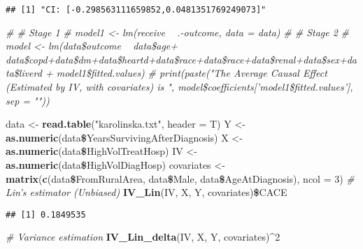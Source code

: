 \documentclass[]{article}
\newenvironment{Shaded}{\begin{snugshade}}{\end{snugshade}}
\newcommand{\KeywordTok}[1]{\textcolor[rgb]{0.13,0.29,0.53}{\textbf{#1}}}
\newcommand{\DataTypeTok}[1]{\textcolor[rgb]{0.13,0.29,0.53}{#1}}
\newcommand{\DecValTok}[1]{\textcolor[rgb]{0.00,0.00,0.81}{#1}}
\newcommand{\StringTok}[1]{\textcolor[rgb]{0.31,0.60,0.02}{#1}}
\newcommand{\CommentTok}[1]{\textcolor[rgb]{0.56,0.35,0.01}{\textit{#1}}}
\newcommand{\OperatorTok}[1]{\textcolor[rgb]{0.81,0.36,0.00}{\textbf{#1}}}
\newcommand{\NormalTok}[1]{#1}
\begin{document}
\begin{verbatim}
## [1] "CI: [-0.298563111659852,0.0481351769249073]"
\end{verbatim}

\begin{Shaded}
\begin{Highlighting}[]
\CommentTok{# # Stage 1}
\CommentTok{# model1 <- lm(receive ~ .-outcome, data = data)}
\CommentTok{# # Stage 2}
\CommentTok{# model <- lm(data\$outcome ~ data\$age+ data\$copd+data\$dm+data\$heartd+data\$race+data\$race+data\$renal+data\$sex+data\$liverd + model1\$fitted.values)}
\CommentTok{# print(paste("The Average Causal Effect (Estimated by IV, with covariates) is ", model\$coefficients['model1\$fitted.values'], sep = ""))}
\end{Highlighting}
\end{Shaded}

\begin{Shaded}
\begin{Highlighting}[]
\NormalTok{data <-}\StringTok{  }\KeywordTok{read.table}\NormalTok{(}\StringTok{"karolinska.txt"}\NormalTok{, }\DataTypeTok{header =}\NormalTok{ T)}
\NormalTok{Y <-}\StringTok{ }\KeywordTok{as.numeric}\NormalTok{(data}\OperatorTok{\$}\NormalTok{YearsSurvivingAfterDiagnosis)}
\NormalTok{X <-}\StringTok{ }\KeywordTok{as.numeric}\NormalTok{(data}\OperatorTok{\$}\NormalTok{HighVolTreatHosp)}
\NormalTok{IV <-}\StringTok{ }\KeywordTok{as.numeric}\NormalTok{(data}\OperatorTok{\$}\NormalTok{HighVolDiagHosp)}
\NormalTok{covariates <-}\StringTok{ }\KeywordTok{matrix}\NormalTok{(}\KeywordTok{c}\NormalTok{(data}\OperatorTok{\$}\NormalTok{FromRuralArea, data}\OperatorTok{\$}\NormalTok{Male, data}\OperatorTok{\$}\NormalTok{AgeAtDiagnosis), }\DataTypeTok{ncol =} \DecValTok{3}\NormalTok{)}
\CommentTok{# Lin's estimator (Unbiased)}
\KeywordTok{IV_Lin}\NormalTok{(IV, X, Y, covariates)}\OperatorTok{\$}\NormalTok{CACE}
\end{Highlighting}
\end{Shaded}

\begin{verbatim}
## [1] 0.1849535
\end{verbatim}

\begin{Shaded}
\begin{Highlighting}[]
\CommentTok{# Variance estimation}
\KeywordTok{IV_Lin_delta}\NormalTok{(IV, X, Y, covariates)}\OperatorTok{^}\DecValTok{2}
\end{Highlighting}
\end{Shaded}
\end{document}
